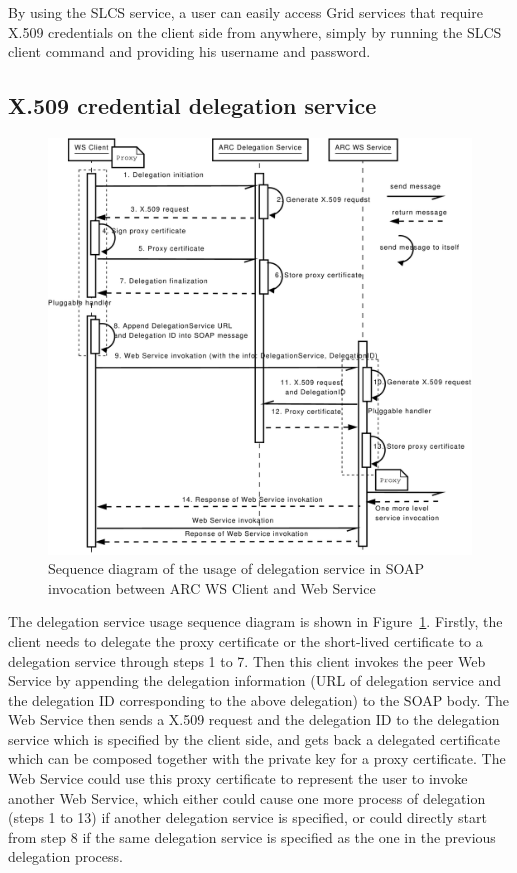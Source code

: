 \documentclass[conference]{IEEEtran}
\begin{document}
By using the SLCS service, a user can easily access Grid services that
require X.509 credentials on the client side from anywhere, simply by running the SLCS
client command and providing his username and password.

\subsection{X.509 credential delegation service}
\label{sec:creddeleg}

\begin{figure}
\includegraphics[width=1.0\columnwidth]{Delegation_UML.pdf}
\caption{Sequence diagram of the usage of delegation service in SOAP invocation 
between ARC WS Client and Web Service}
\label{fig:DelegUML}
\end{figure}

The delegation service usage sequence diagram is shown in
Figure~\ref{fig:DelegUML}. Firstly, the client needs to delegate
the proxy certificate or the short-lived certificate to a delegation service
through steps 1 to 7.
Then this client invokes the peer Web Service by appending the delegation
information (URL of delegation service and the delegation ID corresponding to the above delegation) to the
SOAP body. The Web Service then sends a X.509 request and the delegation ID to the delegation
service which is specified by the client side, and gets back a delegated certificate
which can be composed together with the private key for a proxy certificate. The Web Service could use this
proxy certificate to represent the user to invoke another Web Service, which either could cause
one more process of delegation (steps 1 to 13) if another delegation service is specified, or
could directly start from step 8 if the same delegation service is specified as the one in the
previous delegation process.
\end{document}
